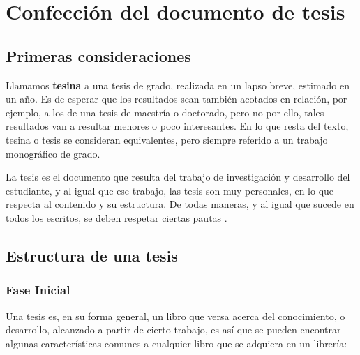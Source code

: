 \chapter{Confección del documento de tesis}

\label{Capitulo_25}
\section{Primeras consideraciones}

Llamamos \textbf{tesina} a una tesis de grado, realizada en un lapso breve, estimado en un año. Es de esperar que los resultados sean también acotados en relación, por ejemplo, a los de una tesis de maestría o doctorado, pero no por ello, tales resultados van a resultar menores o poco interesantes. En lo que resta del texto, tesina o tesis se consideran equivalentes, pero siempre referido a un trabajo monográfico de grado.

La tesis es el documento que resulta del trabajo de investigación y desarrollo del estudiante, y al igual que ese trabajo, las tesis son muy personales, en lo que respecta al contenido y su estructura. De todas maneras, y al igual que sucede en todos los escritos, se deben respetar ciertas pautas \cite{melendrez2006como}.


\section{Estructura de una tesis}
\label{Estructura}
\subsection{Fase Inicial}

Una tesis es, en su forma general, un libro que versa acerca del conocimiento, o desarrollo, alcanzado a partir de cierto trabajo, es así que se pueden encontrar algunas características comunes a cualquier libro que se adquiera en un librería:

